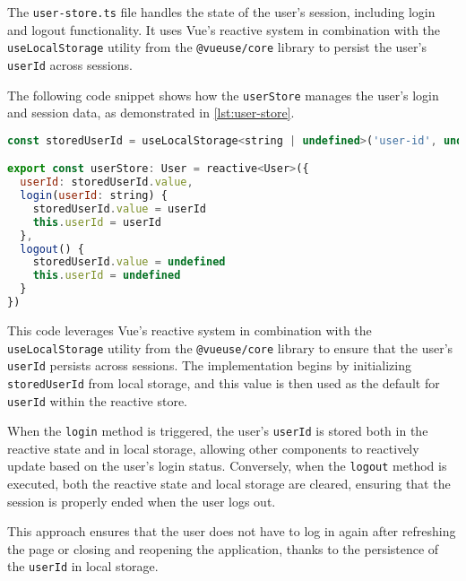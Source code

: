 The \texttt{user-store.ts}
file handles the state of the user's session, including login and logout functionality. It uses Vue’s reactive system in
combination with the \texttt{useLocalStorage} utility from the \texttt{@vueuse/core} library to persist the user's
\texttt{userId} across sessions.

The following code snippet shows how the \texttt{userStore}
manages the user’s login and session data, as demonstrated in \ref{lst:user-store}.

\begin{lstlisting}[language=JavaScript, caption={Managing the User Session (\texttt{user-store.ts})},
  firstnumber=4,label={lst:user-store}]
const storedUserId = useLocalStorage<string | undefined>('user-id', undefined)

export const userStore: User = reactive<User>({
  userId: storedUserId.value,
  login(userId: string) {
    storedUserId.value = userId
    this.userId = userId
  },
  logout() {
    storedUserId.value = undefined
    this.userId = undefined
  }
})
\end{lstlisting}

This code leverages Vue’s reactive system in combination with the \texttt{useLocalStorage} utility from the
\texttt{@vueuse/core} library to ensure that the user’s
\texttt{userId} persists across sessions. The implementation begins
by initializing \texttt{storedUserId} from local storage, and this value is then used as the default for
\texttt{userId} within the reactive store.

When the \texttt{login} method is triggered, the user’s \texttt{userId} is stored both in the reactive
state and in local storage, allowing other components to reactively update based on the user’s login status. Conversely,
when the \texttt{logout} method is executed, both the reactive state and local storage are cleared,
ensuring that the session is properly ended when the user logs out.

This approach ensures that the user does not have to log in again after refreshing the page or
closing and reopening the application, thanks to the persistence of the \texttt{userId} in local storage.
